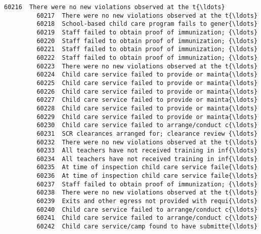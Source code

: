 \documentclass[11pt]{article}
\begin{document}
\begin{Verbatim}[commandchars=\\\{\}]
         60216  There were no new violations observed at the t{\ldots}   
         60217  There were no new violations observed at the t{\ldots}   
         60218  School-based child care program fails to gener{\ldots}   
         60219  Staff failed to obtain proof of immunization; {\ldots}   
         60220  Staff failed to obtain proof of immunization; {\ldots}   
         60221  Staff failed to obtain proof of immunization; {\ldots}   
         60222  Staff failed to obtain proof of immunization; {\ldots}   
         60223  There were no new violations observed at the t{\ldots}   
         60224  Child care service failed to provide or mainta{\ldots}   
         60225  Child care service failed to provide or mainta{\ldots}   
         60226  Child care service failed to provide or mainta{\ldots}   
         60227  Child care service failed to provide or mainta{\ldots}   
         60228  Child care service failed to provide or mainta{\ldots}   
         60229  Child care service failed to provide or mainta{\ldots}   
         60230  Child care service failed to arrange/conduct c{\ldots}   
         60231  SCR clearances arranged for; clearance review {\ldots}   
         60232  There were no new violations observed at the t{\ldots}   
         60233  All teachers have not received training in inf{\ldots}   
         60234  All teachers have not received training in inf{\ldots}   
         60235  At time of inspection child care service faile{\ldots}   
         60236  At time of inspection child care service faile{\ldots}   
         60237  Staff failed to obtain proof of immunization; {\ldots}   
         60238  There were no new violations observed at the t{\ldots}   
         60239  Exits and other egress not provided with requi{\ldots}   
         60240  Child care service failed to arrange/conduct c{\ldots}   
         60241  Child care service failed to arrange/conduct c{\ldots}   
         60242  Child care service/camp found to have submitte{\ldots}   
         

\end{Verbatim}
\end{document}
